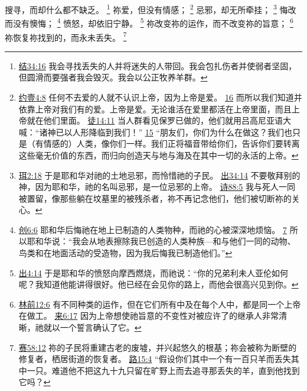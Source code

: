 \documentclass[12pt, a4paper, oneside]{ctexart}
\begin{document}
    搜寻，而却什么都不缺乏。
	\footnote {
        \href{https://biblehub.com/ezekiel/34-16.htm}{结34:16} 我会寻找丢失的人并将迷失的人带回。我会包扎伤者并使弱者坚固，但圆滑而要强者我会毁灭。我会以公正牧养羊群。
	}
	祢爱，但没有情感；
    \footnote {
        \href{https://biblehub.com/1_john/4-8.htm}{约壹4:8} 任何不去爱的人就不认识上帝，因为上帝是爱。
		\href{https://biblehub.com/1_john/4-16.htm}{16} 而所以我们知道并依靠上帝对我们有的爱。上帝是爱。无论谁活在爱里都活在上帝里面，而且上帝就在他们里面。
		\href{https://biblehub.com/acts/14-11.htm}{徒14:11} 当人群看见保罗已做的，他们就用吕高尼亚语大喊：“诸神已以人形降临到我们！”
		\href{https://biblehub.com/acts/14-15.htm}{15} “朋友们，你们为什么在做这？我们也只是（有情感的）人类，像你们一样。我们正将福音带给你们，告诉你们要转离这些毫无价值的东西，而归向创造天与地与海及在其中一切的永活的上帝。
	}
    忌邪，却无所牵挂；
    \footnote {
        \href{https://biblehub.com/joel/2-18.htm}{珥2:18} 于是耶和华对祂的土地忌邪，而怜惜祂的子民。
        \href{https://biblehub.com/exodus/34-14.htm}{出34:14} 不要敬拜别的神，因为耶和华，祂的名叫忌邪，是一位忌邪的上帝。
        \href{https://biblehub.com/psalms/88-5.htm}{诗88:5} 我与死人一同被置留，像那些躺在坟墓里的被残杀者，祢不再记念他们，他们被切断祢的关心。
	}
    悔改而没有懊悔；
    \footnote {
        \href{https://biblehub.com/genesis/6-6.htm}{创6:6} 耶和华后悔祂在地上已制造的人类物种，而祂的心被深深地烦恼。
        \href{https://biblehub.com/genesis/6-7.htm}{7} 所以耶和华说：“我会从地表擦除我已创造的人类种族---和与他们一同的动物、鸟类和在地面活动的受造物，因为我后悔我已制造他们。”
	}
    愤怒，却依旧宁静。
    \footnote {
        \href{https://biblehub.com/exodus/4-14.htm}{出4:14} 于是耶和华的愤怒向摩西燃烧，而祂说：“你的兄弟利未人亚伦如何呢？我知道他能讲得很好。他已经在会见你的路上，而他会很高兴见到你。
	}
	祢改变祢的运作，而不改变祢的旨意；
    \footnote {
        \href{https://biblehub.com/1_corinthians/12-6.htm}{林前12:6} 有不同种类的运作，但在它们所有中及在每个人中，都是同一个上帝在做工。
        \href{https://biblehub.com/hebrews/6-17.htm}{来6:17} 因为上帝想使祂旨意的不变性对被应许了的继承人非常清晰，祂就以一个誓言确认了它。
	}
    祢恢复祢找到的，而永未丢失。
    \footnote {
        \href{https://biblehub.com/isaiah/58-12.htm}{赛58:12} 祢的子民将重建古老的废墟，并兴起悠久的根基；祢会被称为断壁的修复者，栖居街道的恢复者。
        \href{https://biblehub.com/luke/15-4.htm}{路15:4} “假设你们其中一个有一百只羊而丢失其中一只。难道他不把这九十九只留在旷野上而去追寻那丢失的羊，直到他找到它吗？
	}
\end{document}
